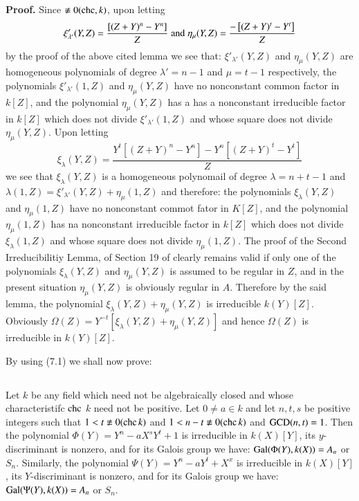 \noindent
\textbf{Proof.} Since $\nequiv 0(\chc, k)$, upon letting
$$
\xi'_{\lambda'}(Y,Z)=\dfrac{\left[(Z+Y)^n-Y^{n}\right]}{Z} \; {\rm and}\; \eta_{\mu}(Y,Z)=\dfrac{-\left[(Z+Y)^t-Y^{t}\right]}{Z}
$$
by the proof of the above cited lemma we see that: $\xi'_{\lambda'}(Y,Z)$ and $\eta_{\mu}(Y,Z)$ are homogeneous polynomials of degree $\lambda'=n-1$ and $\mu = t-1$ respectively, the polynomials $\xi'_{\lambda'}(1,Z)$ and $\eta_{\mu}(Y,Z)$ have no nonconstant common factor in $k[Z]$, and the polynomial $\eta_{\mu}(Y,Z)$ has a has a nonconstant irreducible factor in $k[Z]$ which does not divide $\xi'_{\lambda'}(1,Z)$ and whose square does not divide $\eta_{\mu}(Y,Z)$. Upon letting 
$$
\xi_{\lambda}(Y,Z)=\dfrac{Y^{t}\left[(Z+Y)^{n}-Y^{n}\right]-Y^{n}\left[(Z+Y)^{t}-Y^{t}\right]}{Z}
$$
we see that $\xi_{\lambda}(Y,Z)$ is a homogeneous polynomail of degree $\lambda =n+t-1$ and $\lambda(1,Z)= \xi'_{\lambda'}(Y,Z)+\eta_{\mu}(1,Z)$ and therefore: the polynomials $\xi_{\lambda}(Y,Z)$ and $\eta_{\mu}(1,Z)$ have no  nonconstant commot fator in $K[Z]$, and the polynomial $\eta_{\mu}(1,Z)$ has na nonconstant irreducible factor in $k[Z]$ which does not divide $\xi_{\lambda}(1,Z)$ and whose square does not divide $\eta_{\mu}(1,Z)$. The proof of the Second Irreducibilitiy Lemma, of Section 19 of \cite{art1-key8} clearly remains valid if only one of the polynomials $\xi_{\lambda}(Y,Z)$ and $\eta_{\mu}(Y,Z)$ is assumed to be regular in $Z$, and in the present situation $\eta_{\mu}(Y,Z)$ is obviously regular in $A$. Therefore by the said lemma, the polynomial $\xi_{\lambda}(Y,Z) + \eta_{\mu}(Y,Z)$  is irreducible $k(Y)[Z]$. Obviously $\Omega(Z)=Y^{-t}\left[\xi_{\lambda}(Y,Z) + \eta_{\mu}(Y,Z)\right]$ and hence $\Omega(Z)$ is irreducible in $k(Y)[Z]$.

By using (7.1) we shall now prove:

\subsection{}

Let $k$ be any field which need not be algebraically closed and whose characteristifc $\operatorname{chc}$ $k$  need not be positive. Let $0 \neq a\in k$ and let $n, t, s$ be positive integers such that $1 < t\nequiv 0(\chc k)$ and $1 < n-t \nequiv 0(\chc k)$ and $\operatorname{GCD}(n, t) =1$. Then the polynomial $\Phi(Y)=Y^{n}-aX^{s}Y^{t}+1$ is irreducible in $k(X)[Y]$, its $y$-discriminant is nonzero, and for its Galois group we have: $\operatorname{Gal}(\Phi(Y), k(X))=A_{n}$ or $S_{n}$. Similarly, the polynomial $\Psi(Y)=Y^{n}-aY^{t}+X^{x}$ is irreducible in $k(X)[Y]$, its $Y$-discriminant is nonzero, and for its Galois group we have: $\operatorname{Gal}(\Psi(Y), k(X))=A_{n}$ or $S_{n}$.

